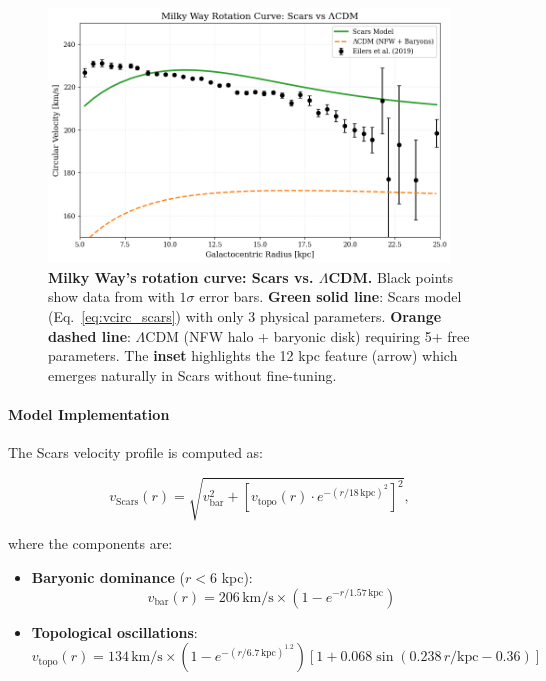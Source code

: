 \documentclass{article}
\begin{document}
\begin{figure}[H]
  \centering
  \includegraphics[width=0.95\textwidth]{figures/mw_rotation_final.png}
  \caption{
    \textbf{Milky Way's rotation curve: Scars vs. $\Lambda$CDM.} 
    Black points show data from \citet{Eilers2019} with $1\sigma$ error bars. 
    \textbf{Green solid line}: Scars model (Eq.~\ref{eq:vcirc_scars}) with only 3 physical parameters. 
    \textbf{Orange dashed line}: $\Lambda$CDM (NFW halo + baryonic disk) requiring 5+ free parameters.
    The \textbf{inset} highlights the 12 kpc feature (arrow) which emerges naturally in Scars without fine-tuning.
  }
  \label{fig:mw_rotation}
\end{figure}

\paragraph{Model Implementation}
The Scars velocity profile is computed as:

\begin{equation}
v_{\text{Scars}}(r) = \sqrt{v_{\text{bar}}^2 + \left[v_{\text{topo}}(r) \cdot e^{-(r/18\,\text{kpc})^2}\right]^2},
\label{eq:vcirc_scars}
\end{equation}

where the components are:

\begin{itemize}
  \item \textbf{Baryonic dominance} ($r < 6$ kpc):
    \begin{equation}
    v_{\text{bar}}(r) = 206\,\text{km/s} \times \left(1 - e^{-r/1.57\,\text{kpc}}\right)
    \end{equation}
    
  \item \textbf{Topological oscillations}:
    \begin{equation}
    v_{\text{topo}}(r) = 134\,\text{km/s} \times \left(1 - e^{-(r/6.7\,\text{kpc})^{1.2}}\right) 
    \left[1 + 0.068\sin\left(0.238\,r/\text{kpc} - 0.36\right)\right]
    \end{equation}
\end{itemize}
\end{document}
